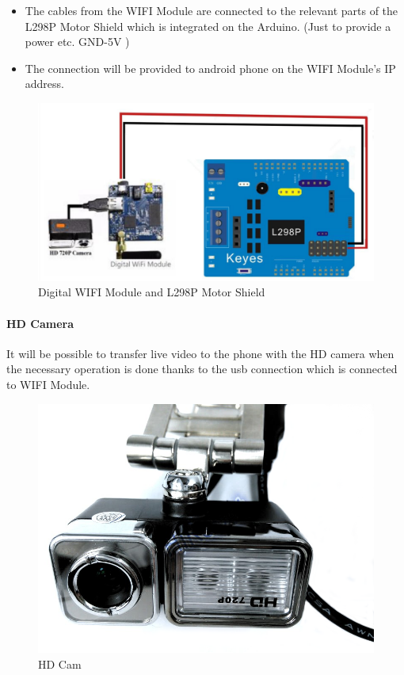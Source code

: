 \documentclass[11pt]{article}
\begin{document}
\begin{itemize}
\item The cables from the WIFI Module are connected to the relevant parts of the L298P Motor Shield which is integrated on the Arduino. (Just to provide a power etc. GND-5V )
\item The connection will be provided to android phone on the
WIFI Module's IP address.
\end{itemize}
\begin{figure}[h]
\centering
\includegraphics[scale=0.35]{connectwifi.png}
\caption{Digital WIFI Module and L298P Motor Shield}
\end{figure}

\vspace{0.2cm}

\paragraph{HD Camera}
\begin{flushleft}
It will be possible to transfer live video to the phone with the HD camera when the necessary operation is done thanks to the usb connection which is connected to WIFI Module.
\end{flushleft}
\vspace{0.3cm}
\begin{figure}[h]
\centering
\includegraphics[scale=0.25]{camtemiz.png}
\caption{HD Cam}
\end{figure}
\end{document}
